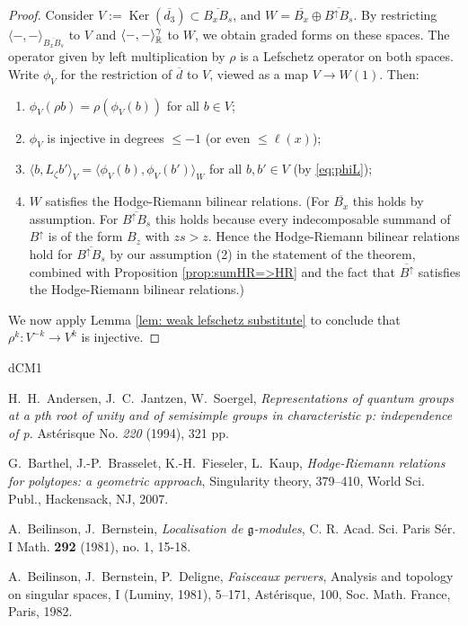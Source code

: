 \documentclass[11pt]{amsart}
\numberwithin{equation}{section}
\def\g{\gamma}
\def\z{\zeta}
\DeclareMathOperator{\Ker}{Ker}
\def\ov{\overline}
\def\to{\rightarrow}
\theoremstyle{definition}
\theoremstyle{remark}
\begin{document}
{\begin{proof}
Consider $V := \Ker(\overline{d_3}) \subset \ov{B_xB_s}$, and $W = \ov{B_x}
\oplus \ov{B^{\uparrow} B_s}$. By restricting $\langle -,-
\rangle_{\overline{B_xB_s}}$ to $V$ and $\langle -,- \rangle_\RM^\g$ to
$W$, we obtain graded forms on these spaces. The operator given by
left multiplication by $\rho$ is a Lefschetz operator on both
spaces. Write $\phi_V$ for the restriction of 
$\overline{d}$ to $V$, viewed as a map $V \to W(1)$. Then:
\begin{enumerate}
\item $\phi_V(\rho b) = \rho(\phi_V(b))$ for all $b \in V$;
\item $\phi_V$ is injective in degrees $\le -1$ (or even $\le \ell(x)$);
\item $\langle b, L_\z b' \rangle_V = \langle \phi_V(b), \phi_V(b')
  \rangle_W$ for all $b, b' \in V$ (by \eqref{eq:phiL});
\item $W$
satisfies the Hodge-Riemann bilinear relations. (For $\overline{B_x}$ this holds
by assumption. For $\ov{B^{\uparrow} B_s}$ this holds because every
indecomposable summand of $B^\uparrow$ is of the form $B_z$ with $zs >
z$. Hence the Hodge-Riemann bilinear relations hold for
$\ov{B^{\uparrow} B_s}$ by our assumption (2) in the 
statement of the theorem, combined with Proposition
\ref{prop:sumHR=>HR} and the fact that $\overline{B^\uparrow}$
satisfies the Hodge-Riemann bilinear relations.)
\end{enumerate}
We now apply Lemma \ref{lem: weak lefschetz substitute} to
conclude that $\rho^k : V^{-k} \to V^k$ is injective.
\end{proof}

\begin{thebibliography}{dCM1}

H.~H.~Andersen, J.~C.~Jantzen, W.~Soergel,
\textit{Representations of quantum groups at a pth root of unity and of semisimple groups in characteristic p: independence of p.}
Ast\'erisque No. \textit{220} (1994), 321 pp. 

G.~Barthel, J.-P.~Brasselet, K.-H.~Fieseler, L.~Kaup,
\textit{Hodge-Riemann relations for polytopes: a geometric approach}, Singularity theory, 379--410, World Sci. Publ., Hackensack,
NJ, 2007. 

A.~Beilinson, J.~Bernstein, \textit{Localisation de
  $\mathfrak{g}$-modules},
C. R. Acad. Sci. Paris S\'er. I Math. \textbf{292} (1981), no. 1, 15-18. 

A.~Beilinson, J.~Bernstein, P.~Deligne,
\textit{Faisceaux pervers}, Analysis and topology on singular spaces, I (Luminy, 1981), 5--171,
Ast\'erisque, 100, Soc. Math. France, Paris, 1982. 


\end{thebibliography}}
\end{document}
